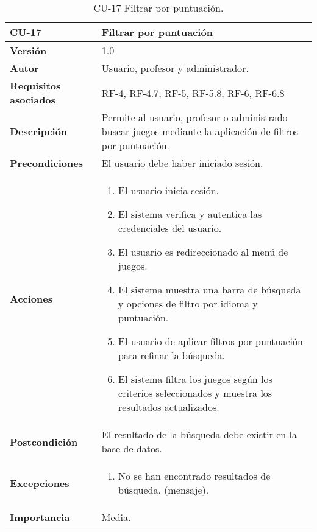 \begin{table}[h!]
	\centering
	\begin{tabularx}{\linewidth}{ p{} p{} }
		\toprule
		\textbf{CU-17}    & \textbf{Filtrar por puntuación}\\
		\toprule
		\textbf{Versión}              & 1.0    \\
		\textbf{Autor}                & Usuario, profesor y administrador. \\
		\textbf{Requisitos asociados} & RF-4, RF-4.7, RF-5, RF-5.8, RF-6, RF-6.8 \\
		\textbf{Descripción}          & Permite al usuario, profesor o administrado buscar juegos mediante la aplicación de filtros por puntuación.\\
		\textbf{Precondiciones}         & El usuario debe haber iniciado sesión. \\
		\textbf{Acciones}             &
		\begin{enumerate}
			\def\labelenumi{\arabic{enumi}.}
			\tightlist
			\item El usuario inicia sesión.
            \item El sistema verifica y autentica las credenciales del usuario.
            \item El usuario es redireccionado al menú de juegos.
            \item El sistema muestra una barra de búsqueda y opciones de filtro por idioma y puntuación.
            \item El usuario de aplicar filtros por puntuación para refinar la búsqueda.
            \item El sistema filtra los juegos según los criterios seleccionados y muestra los resultados actualizados.
		\end{enumerate}\\
         \textbf{Postcondición}             & El resultado de la búsqueda debe existir en la base de datos. \\
		\textbf{Excepciones}             &
		\begin{enumerate}
			\def\labelenumi{\arabic{enumi}.}
			\tightlist
			\item No se han encontrado resultados de búsqueda. (mensaje).
		\end{enumerate}\\
		\textbf{Importancia}          & Media. \\
		\bottomrule
	\end{tabularx}
	\caption{CU-17 Filtrar por puntuación.}
\end{table}

